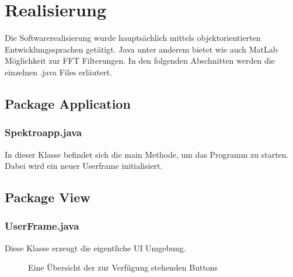 \documentclass[12pt,a4paper]{article}
\begin{document}
\section{Realisierung}
Die Softwarerealisierung wurde hauptsächlich mittels objektorientierten Entwicklungssprachen getätigt. Java unter anderem bietet wie auch MatLab Möglichkeit zur FFT Filterungen.
In den folgenden Abschnitten werden die einzelnen .java Files erläutert.
\subsection{Package Application}
\subsubsection{Spektroapp.java}
In dieser Klasse befindet sich die main Methode, um das Programm zu starten. Dabei wird ein neuer Userframe initialisiert.
\subsection{Package View}
\subsubsection{UserFrame.java}
Diese Klasse erzeugt die eigentliche UI Umgebung.

\begin{figure} [h]%
	\centering
	\label{fig:overview_layout} 
	\caption{Eine Übersicht der zur Verfügung stehenden Buttons}
\end{figure}
\end{document}
